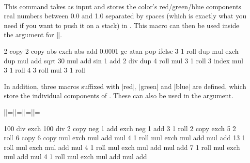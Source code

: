 \begin{command}{\pgfdeclarefunctionalshading{}\\
}
    \begin{command}{\pgfshadecolortorgb{}}
        This command takes  as input and stores the color's
        red/green/blue components real numbers between 0.0 and 1.0 separated by
        spaces (which is exactly what you need if you want to push it on a
        stack) in . This macro can then be used inside the
         argument for |\pgfdeclarefunctionalshading|.
\begin{codeexample}[]
{\pgfpoint{1cm}{1cm}}{}{
  2 copy        %
  2 copy abs exch abs add 0.0001 ge { atan } { pop } ifelse
  3 1 roll
  dup mul exch
  dup mul add sqrt
  30 mul
  add
  sin
  1 add 2 div
  dup
   4 roll      %
  mul
  3 1 roll
  3 index
  mul
  3 1 roll
  4 3 roll
  mul
  3 1 roll
}
%
%
%
\end{codeexample}

        In addition, three macros suffixed with |red|, |green| and |blue| are
        defined, which store the individual components of .
        These can also be used in the  argument.
\begin{codeexample}[]
|\mycol|=\mycol |\mycolred|=\mycolred |\mycolgreen|=\mycolgreen |\mycolblue|=\mycolblue
\end{codeexample}
    \end{command}

\begin{codeexample}[]
{\pgfpointorigin}{\pgfpoint{100bp}{100bp}}
{
}{
  100 div exch 100 div 2 copy                   %
  neg 1 add exch neg 1 add                      %
  3 1 roll 2 copy exch 5 2 roll 6 copy 6 copy   %
  \firstred mul exch \secondred mul add mul     %
  4 1 roll
  \thirdred mul exch \fourthred mul add mul
  add
  13 1 roll
  \firstgreen mul exch \secondgreen mul add mul %
  4 1 roll
  \thirdgreen mul exch \fourthgreen mul add mul
  add
  7 1 roll
  \firstblue mul exch \secondblue mul add mul   %
  4 1 roll
  \thirdblue mul exch \fourthblue mul add mul
  add
}

\end{codeexample}
\end{command}


